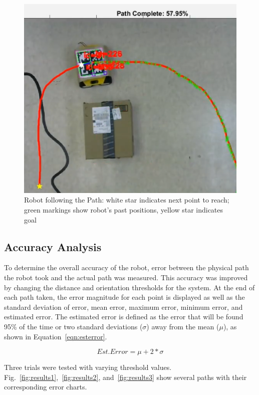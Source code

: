 \documentclass[12pt,american]{report}
\begin{document}
\begin{figure}[h!]
\centering
\includegraphics[scale=.5]{images/star.PNG}
\caption{Robot following the Path: white star indicates next point to reach; green markings show robot's past positions, yellow star indicates goal}
\label{fig:pathfollowing}
\end{figure}

\subsection{Accuracy Analysis}
To determine the overall accuracy of the robot, error between the physical path the robot took and the actual path was measured. This accuracy was improved by changing the distance and orientation thresholds for the system. At the end of each path taken, the error magnitude for each point is displayed as well as the standard deviation of error, mean error, maximum error, minimum error, and estimated error. The estimated error is defined as the error that will be found 95\% of the time or two standard deviations ($\sigma$) away from the mean ($\mu$), as shown in Equation~\ref{eqn:esterror}. 

\begin{equation}
Est. Error = \mu + 2*\sigma 
\label{eqn:esterror}
\end{equation}

Three trials were tested with varying threshold values.  Fig.~\ref{fig:results1},~\ref{fig:results2}, and~\ref{fig:results3} show several paths with their corresponding error charts.
\end{document}
